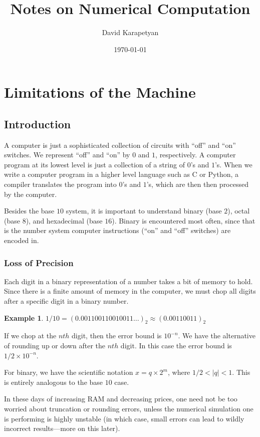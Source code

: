 \documentclass[12pt,reqno]{amsart}
\numberwithin{equation}{section}  %
\newtheorem{example}{Example}[section]
\begin{document}
\title{Notes on Numerical Computation }
\author{David Karapetyan}
\date{\today}
%
\maketitle
%
%
%
%
\section{Limitations of the Machine}
\subsection{Introduction}
A computer is just a sophisticated collection of circuits
with ``off'' and ``on'' switches. We represent ``off'' and
``on'' by $0$ and $1$, respectively. A computer program 
at its lowest level is just a collection of a string of $0$'s and $1$'s.
When we write a computer program in a higher level language such as C
or Python, a compiler translates the program into $0$'s and $1$'s,
which are then then processed by the computer.

Besides the base $10$ system, it is important to understand binary (base $2$),
octal (base $8$), and hexadecimal (base $16$). Binary is encountered most often,
since that is the number system computer instructions (``on'' and ``off'' switches)
are encoded in.

\subsubsection{Loss of Precision}
Each digit in a binary representation of a number takes a bit of memory to hold.
Since there is a finite amount of memory in the computer, we must chop all digits
after a specific digit in a binary number. 
\begin{example}
$1/10 = (0.001100110010011\ldots)_2 \approx (0.00110011)_2$
\end{example}
If we chop at the $nth$ digit, then the error bound is $10^{-n}$.
We have the alternative of rounding up or down after the $nth$ digit. 
In this case the error bound is $1/2 \times 10^{-n}$.

For binary, we have the scientific notation $x = q \times 2^{m}$, where
$1/2 < |q| < 1$. This is entirely analogous to the base $10$ case.

In these days of increasing RAM and decreasing prices, one need not be too worried
about truncation or rounding errors, unless the numerical simulation one is performing
is highly unstable (in which case, small errors can lead to wildly incorrect results---more
on this later).
\end{document}

